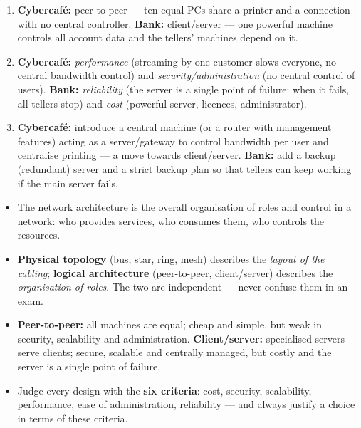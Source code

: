 \documentclass[11pt]{article}
\newcommand{\cle}[1]{{\popxbold\color{popdark}#1}}
\begin{document}
\begin{corrige}[Exercise 1]
\begin{enumerate}
\item \textbf{Cybercafé:} peer-to-peer --- ten equal PCs share a printer and a connection with no central controller. \textbf{Bank:} client/server --- one powerful machine controls all account data and the tellers' machines depend on it.
\item \textbf{Cybercafé:} \emph{performance} (streaming by one customer slows everyone, no central bandwidth control) and \emph{security/administration} (no central control of users). \textbf{Bank:} \emph{reliability} (the server is a single point of failure: when it fails, all tellers stop) and \emph{cost} (powerful server, licences, administrator).
\item \textbf{Cybercafé:} introduce a central machine (or a router with management features) acting as a server/gateway to control bandwidth per user and centralise printing --- a move towards client/server. \textbf{Bank:} add a backup (redundant) server and a strict backup plan so that tellers can keep working if the main server fails.
\end{enumerate}
\end{corrige}

\begin{aretenir}
\begin{itemize}
\item The \cle{network architecture} is the overall organisation of roles and control in a network: who provides services, who consumes them, who controls the resources.
\item \textbf{Physical topology} (bus, star, ring, mesh) describes the \emph{layout of the cabling}; \textbf{logical architecture} (peer-to-peer, client/server) describes the \emph{organisation of roles}. The two are independent --- never confuse them in an exam.
\item \textbf{Peer-to-peer:} all machines are equal; cheap and simple, but weak in security, scalability and administration. \textbf{Client/server:} specialised servers serve clients; secure, scalable and centrally managed, but costly and the server is a single point of failure.
\item Judge every design with the \textbf{six criteria}: cost, security, scalability, performance, ease of administration, reliability --- and always justify a choice in terms of these criteria.
\end{itemize}
\end{aretenir}
\end{document}
